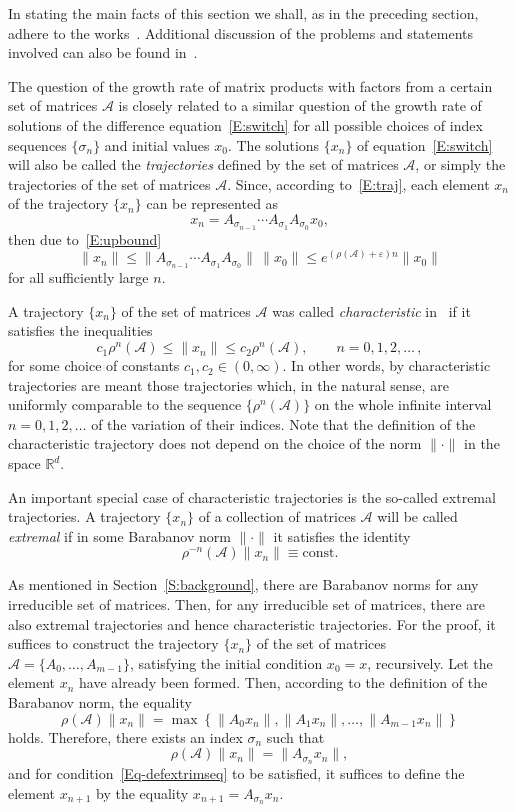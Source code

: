 \documentclass[a4paper,10pt,reqno]{amsart}
\let\cite\citep
\newcommand{\setA}{\mathscr{A}}
\begin{document}
In stating the main facts of this section we shall, as in the preceding
section, adhere to the works~\cite{Koz:CDC05:e, Koz:INFOPROC05:e,
Koz:INFOPROC06:e}. Additional discussion of the problems and statements
involved can also be found in~\cite{Jungers:09}.

The question of the growth rate of matrix products with factors from a
certain set of matrices $\setA$ is closely related to a similar question of
the growth rate of solutions of the difference equation~\eqref{E:switch} for
all possible choices of index sequences $\{\sigma_{n}\}$ and initial values
$x_{0}$. The solutions $\{x_{n}\}$ of equation~\eqref{E:switch} will also be
called the \emph{trajectories} defined by the set of matrices $\setA$, or
simply the trajectories of the set of matrices $\setA$. Since, according
to~\eqref{E:traj}, each element $x_{n}$ of the trajectory $\{x_{n}\}$ can be
represented as
\[
x_{n}= A_{\sigma_{n-1}}\cdots A_{\sigma_{1}}A_{\sigma_{0}}x_{0},
\]
then due to~\eqref{E:upbound}
\[
\|x_{n}\|\le \|A_{\sigma_{n-1}}\cdots
A_{\sigma_{1}}A_{\sigma_{0}}\|\,\|x_{0}\|\le
e^{(\rho({\setA})+\varepsilon)n}\|x_{0}\|
\]
for all sufficiently large $n$.

A trajectory $\{x_{n}\}$ of the set of matrices $\setA$ was called
\emph{characteristic} in~\cite{Koz:CDC05:e, Koz:INFOPROC05:e,
Koz:INFOPROC06:e} if it satisfies the inequalities
\[
c_{1}\rho^{n}(\setA)\le\|x_{n}\|\le c_{2}\rho^{n}(\setA), \qquad
n=0,1,2,\ldots\,,
\]
for some choice of constants $c_{1}, c_{2}\in(0,\infty)$. In other words, by
characteristic trajectories are meant those trajectories which, in the
natural sense, are uniformly comparable to the sequence $\{\rho^{n}(\setA)\}$
on the whole infinite interval $n=0,1,2,\ldots$ of the variation of their
indices. Note that the definition of the characteristic trajectory does not
depend on the choice of the norm $\|\cdot\|$ in the space $\mathbb{R}^{d}$.

An important special case of characteristic trajectories is the so-called
extremal trajectories. A trajectory $\{x_{n}\}$ of a collection of matrices
$\setA$ will be called \emph{extremal} if in some Barabanov norm $\|\cdot\|$
it satisfies the identity
\begin{equation}\label{Eq-defextrimseq}
\rho^{-n}(\setA)\|x_{n}\| \equiv \textrm{const}.
\end{equation}

As mentioned in Section~\ref{S:background}, there are Barabanov norms for any
irreducible set of matrices. Then, for any irreducible set of matrices, there
are also extremal trajectories and hence characteristic trajectories. For the
proof, it suffices to construct the trajectory $\{x_{n}\}$ of the set of
matrices $\setA=\{A_{0},\ldots,A_{m-1}\}$, satisfying the initial condition
$x_{0}=x$, recursively. Let the element $x_{n}$ have already been formed.
Then, according to the definition of the Barabanov norm, the equality
\[
\rho(\setA)\|x_{n}\|=
\max\left\{\|A_{0}x_{n}\|,\|A_{1}x_{n}\|,\ldots,\|A_{m-1}x_{n}\|\right\}
\]
holds. Therefore, there exists an index $\sigma_{n}$ such that
\[
\rho(\setA)\|x_{n}\|= \|A_{\sigma_{n}}x_{n}\|,
\]
and for condition~\eqref{Eq-defextrimseq} to be satisfied, it suffices to
define the element $x_{n+1}$ by the equality $x_{n+1}=A_{\sigma_{n}}x_{n}$.
\end{document}
